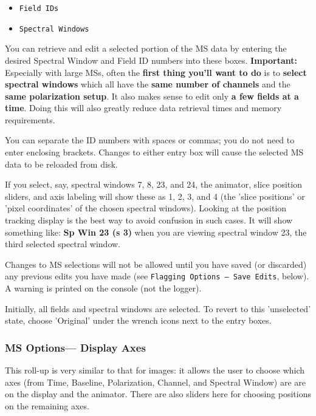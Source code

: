 \begin{itemize}

\item {\tt Field IDs}

\item {\tt Spectral Windows}

\end{itemize}

You can retrieve and edit a selected portion of the MS data
by entering the desired Spectral Window and Field ID numbers into
these boxes.  {\bf Important:} Especially with large MSs, often the
{\bf first thing you'll want to do} is to {\bf select spectral windows}
which all have the {\bf same number of channels} and the
{\bf same polarization setup}.  It also makes sense to edit only
{\bf a few fields at a time}.   Doing this will also
greatly reduce data retrieval times and memory requirements.

You can separate the ID numbers with spaces or commas; you do not need to
enter enclosing brackets.  Changes to either entry box will cause
the selected MS data to be reloaded from disk.

If you select, say, spectral windows 7, 8, 23, and 24, the animator, slice
position sliders, and axis labeling will show 
these as 1, 2, 3, and 4 (the 'slice positions' or 'pixel coordinates' of the
chosen spectral windows).  Looking at the position tracking display is the best
way to avoid confusion in such cases.  It will show something like: 
{\bf Sp Win 23 (s 3)} when you are viewing spectral window 23, the third 
selected spectral window.

Changes to MS selections will not be allowed until you have saved
(or discarded) any previous edits you have made (see {\tt Flagging Options 
-- Save Edits}, below).  A warning is printed on the console (not the logger).

Initially, all fields and spectral windows are selected.  To revert to
this 'unselected' state, choose 'Original' under the wrench
icons next to the entry boxes.


\subsubsection{MS Options--- Display Axes}
\label{section:display.ms.adjust.axes}

This roll-up is very similar to that for images: it allows the user to
choose which axes (from Time, Baseline, Polarization, Channel, and
Spectral Window) are are on the display and the animator.  There are
also sliders here for choosing positions on the remaining axes.


